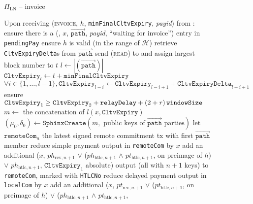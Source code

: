   \begin{figure}[H]
    \begin{protocolbox}{$\Pi_{\mathrm{LN}}$ -- invoice}
      \begin{algorithmic}[1]
        \State Upon receiving (\textsc{invoice}, $h$,
        \texttt{minFinalCltvExpiry}, \textit{payid}) from \bob:
        \label{alg:protocol:pay:invoice:receive}
        \Indent
          \State ensure there is a (\bob, $x$, $\overrightarrow{\mathtt{path}}$,
          \redden{\_,} \textit{payid}, ``waiting for invoice'') entry in
          \texttt{pendingPay}
          \State ensure $h$ is valid (in the range of $\mathcal{H}$)
          \State {}
          \State retrieve \texttt{CltvExpiryDelta}s from
          $\overrightarrow{\mathtt{path}}$
          \State send (\textsc{read}) to \ledger{} and assign largest block
          number to $t$
          \State $l \gets |\left(\overrightarrow{\mathtt{path}}\right)|$
          \State $\mathtt{CltvExpiry}_l \gets t + \mathtt{minFinalCltvExpiry}$
          \State $\forall i \in \{1, \dots, l - 1\}, \mathtt{CltvExpiry}_{l - i}
          \gets \mathtt{CltvExpiry}_{l - i + 1} + \mathtt{CltvExpiryDelta}_{l -
          i + 1}$
          \label{alg:protocol:pay:invoice:cltv}
          \State ensure $\mathtt{CltvExpiry}_1 \geq \mathtt{CltvExpiry}_2 +
          \mathtt{relayDelay} + \left(2 + r\right)\texttt{windowSize}$
          \State $m \gets$ the concatenation of $l \left(x,
          \mathtt{CltvExpiry}\right)$
          \State $\left(\mu_0, \delta_0\right) \gets
          \mathtt{SphinxCreate}\left(m, \text{ public keys of }
          \overrightarrow{\mathtt{path}} \text{ parties}\right)$
          \State let $\mathtt{remoteCom}_n$ the latest signed remote commitment
          tx with first $\overrightarrow{\mathtt{path}}$ member
          \State reduce simple payment output in \texttt{remoteCom} by $x$
          \State add an additional ($x$, $ph_{\mathrm{rev}, n+1}$ $\vee$
          ($ph_{\mathrm{htlc}, n+1}$ $\wedge$ $pt_{\mathrm{htlc}, n+1}$,
          on preimage of $h$) $\vee$
          $ph_{\mathrm{htlc}, n+1}$, $\mathtt{CltvExpiry}_1$ absolute)
          output (all with $n+1$ keys) to \texttt{remoteCom}, marked with
          \texttt{HTLCNo}
          \State reduce delayed payment output in \texttt{localCom} by $x$
          \State add an additional ($x$, $pt_{\mathrm{rev}, n+1}$ $\vee$
          ($pt_{\mathrm{htlc}, n+1}$, on preimage of $h$) $\vee$
          ($ph_{\mathrm{htlc}, n+1}$ $\wedge$ $pt_{\mathrm{htlc}, n+1}$,

\end{algorithmic}
\end{protocolbox}
\end{figure}
